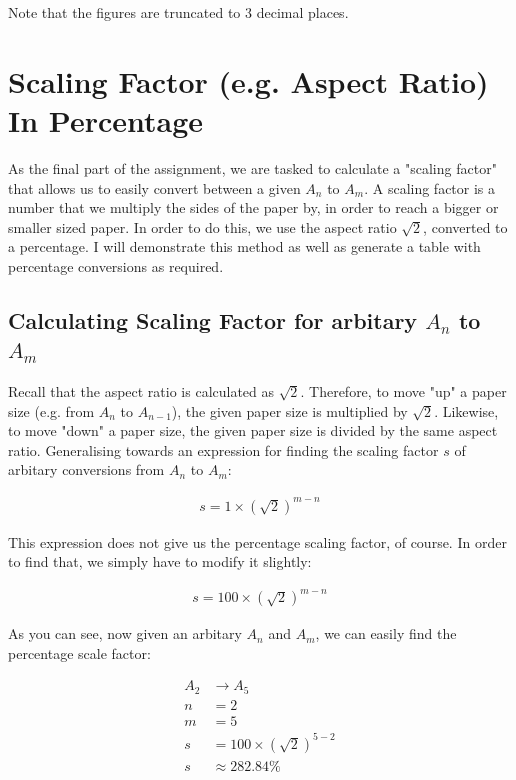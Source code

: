 \noindent
Note that the figures are truncated to 3 decimal places.

\section*{Scaling Factor (e.g. Aspect Ratio) In Percentage}
As the final part of the assignment, we are tasked to calculate a "scaling factor" that allows us to easily convert between a given $A_n$ to $A_m$. A scaling factor is a number that we multiply the sides of the paper by, in order to reach a bigger or smaller sized paper. In order to do this, we use the aspect ratio $\sqrt{2}$, converted to a percentage. I will demonstrate this method as well as generate a table with percentage conversions as required.

\subsection*{Calculating Scaling Factor for arbitary $A_n$ to $A_m$}
Recall that the aspect ratio is calculated as $\sqrt{2}$. Therefore, to move "up" a paper size (e.g. from $A_n$ to $A_{n - 1}$), the given paper size is multiplied by $\sqrt{2}$. Likewise, to move "down" a paper size, the given paper size is divided by the same aspect ratio. Generalising towards an expression for finding the scaling factor $s$ of arbitary conversions from $A_n$ to $A_m$:

\begin{align*}
  s = 1 \times \left(\sqrt{2}\right)^{m - n}
\end{align*}

\noindent
This expression does not give us the percentage scaling factor, of course. In order to find that, we simply have to modify it slightly:

\begin{align*}
  s = 100 \times \left(\sqrt{2}\right)^{m - n}
\end{align*}

\noindent
As you can see, now given an arbitary $A_n$ and $A_m$, we can easily find the percentage scale factor:

\begin{align*}
  A_2 &\rightarrow A_5 \\
  n &= 2 \\
  m &= 5 \\
  s &= 100 \times \left(\sqrt{2}\right)^{5 - 2} \\
  s &\approx 282.84 \%
\end{align*}

